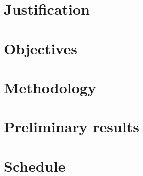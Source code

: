 \documentclass[
	12pt,				%
	oneside,
	a4paper,			%
	english,			%
	french,				%
	spanish,			%
	brazilian  			%
	]{abntex2}
\theoremstyle{definition}
\begin{document}


\chapter{Justification}



\chapter{Objectives}



\chapter{Methodology}



\chapter{Preliminary results}
\label{sec:preliminary}



\chapter{Schedule}





\postextual


%
\printbibliography



\end{document}
